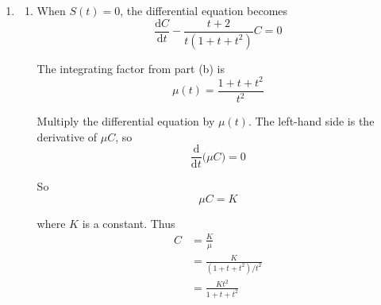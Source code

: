 \documentclass[leqno]{article}
\begin{document}
\begin{enumerate}[
  label=\textbf{\arabic*.},
  leftmargin=*,
  topsep=0pt,
  partopsep=0pt,
  parsep=0pt
]
\begin{djsSolution}
\begin{enumerate}[label=\textbf{(\alph*)}]
  Comparing coefficients with $-2-t+0t^2$:
  \begin{align*}
  A&=-2 \\
  A+D&=-1 \\
  A+B&=0
  \end{align*}

  So
  \[
  A=-2,\qquad D=1,\qquad B=2
  \]

  Therefore
  \[
  -\frac{t+2}{t(1+t+t^2)}=-\frac{2}{t}+\frac{2t+1}{1+t+t^2}
  \]

  Since $t>0$:
  \begin{align*}
  \int -\frac{t+2}{t(1+t+t^2)}\,\mathrm{d}t
  &= \int\left(-\frac{2}{t}+\frac{2t+1}{1+t+t^2}\right)\,\mathrm{d}t \\
  &= -2\ln t+\ln(1+t+t^2)
  \end{align*}

  The integrating factor is
  \begin{align*}
  \mu(t)
  &= e^{\int -\frac{t+2}{t(1+t+t^2)}\,\mathrm{d}t} \\
  &= e^{-2\ln t+\ln(1+t+t^2)} \\
  &= e^{\ln(1+t+t^2)}e^{-2\ln t} \\
  &= (1+t+t^2)t^{-2} \\
  &= \frac{1+t+t^2}{t^2}
  \end{align*}

  So the integrating factor is $\frac{1+t+t^2}{t^2}$.

  \item
  \begin{enumerate}[label=(\roman*)]
    \item When $S(t)=0$, the differential equation becomes
    \[
    \frac{\mathrm{d}C}{\mathrm{d}t}-\frac{t+2}{t(1+t+t^2)}C=0
    \]

    The integrating factor from part (b) is
    \[
    \mu(t)=\frac{1+t+t^2}{t^2}
    \]

    Multiply the differential equation by $\mu(t)$. The left-hand side is the derivative of $\mu C$, so
    \[
    \frac{\mathrm{d}}{\mathrm{d}t}\bigl(\mu C\bigr)=0
    \]

    So
    \[
    \mu C=K
    \]

    where $K$ is a constant. Thus
    \begin{align*}
    C
    &= \frac{K}{\mu} \\
    &= \frac{K}{(1+t+t^2)/t^2} \\
    &= \frac{Kt^2}{1+t+t^2}
    \end{align*}


\end{enumerate}
\end{enumerate}
\end{djsSolution}
\end{enumerate}
\end{document}
